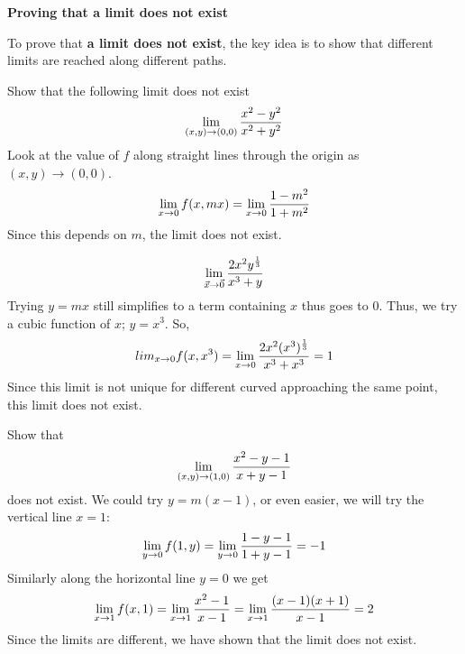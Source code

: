 \documentclass[english, 11pt]{article}
\begin{document}
 \begin{center}
  \end{center}

\textbf{Proving that a limit does not exist}

To prove that \textbf{a limit does not exist}, the key idea is to show that different limits are reached along different paths.

  \begin{exmp}
    Show that the following limit does not exist
    \[ \lim_{(x,y) \rightarrow (0,0)} \frac{x^2-y^2}{x^2+y^2} \]
    Look at the value of $f$ along straight lines through the origin as $(x,y) \rightarrow (0,0)$.
    \[ \lim_{x \rightarrow 0} f(x,mx) = \lim_{x\rightarrow 0} \frac{1-m^2}{1+m^2} \]
    Since this depends on $m$, the limit does not exist.
  \end{exmp}

  \begin{exmp}
    \[ \lim_{\vec{x} \rightarrow \vec{0}} \frac{2x^2 y^{\frac{1}{3}}}{x^3 + y} \]
    Trying $y = mx$ still simplifies to a term containing $x$ thus goes to 0. Thus, we try a cubic function of $x$; $y = x^3$. So,
    \[ lim_{x\rightarrow 0} f(x,x^3) = \lim_{x\rightarrow 0}\frac{2x^2(x^3)^{\frac{1}{3}}}{x^3 + x^3} = 1 \]
    Since this limit is not unique for different curved approaching the same point, this limit does not exist.
  \end{exmp}

  \begin{exmp}
    Show that
    \[ \lim_{(x,y)\rightarrow(1,0)} \frac{x^2 - y - 1}{x + y - 1} \]
    does not exist. We could try $y = m(x-1)$, or even easier, we will try the vertical line $x = 1$:
    \[ \lim_{y\rightarrow0}f(1,y) = \lim_{y\rightarrow 0} \frac{1 - y - 1}{1 + y - 1} = -1\]
    Similarly along the horizontal line $y = 0$ we get
    \[ \lim_{x\rightarrow1}f(x,1) = \lim_{x\rightarrow 1} \frac{x^2 - 1}{x - 1} = \lim_{x\rightarrow 1} \frac{(x-1)(x+1)}{x-1} = 2\]
    Since the limits are different, we have shown that the limit does not exist.
  \end{exmp}
\end{document}
